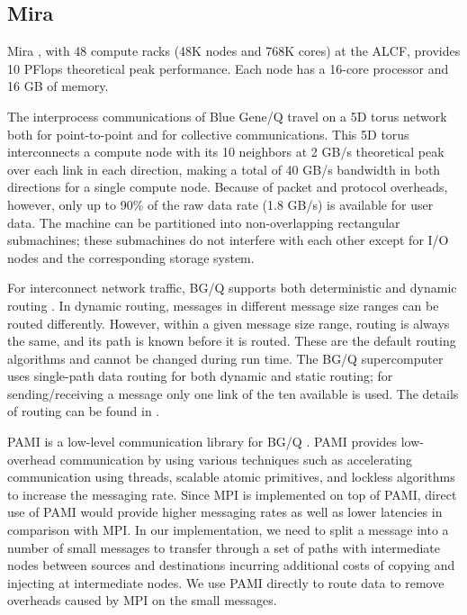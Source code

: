 \subsection{Mira}
\label{sec:system}

Mira \cite{Chen:BGQ}, with 48 compute racks (48K nodes and 768K cores) at the ALCF, provides 10 PFlops theoretical peak performance. Each node has a 16-core processor and 16 GB of memory.

The interprocess communications of Blue Gene/Q travel on a 5D torus network both for point-to-point and for collective communications. This 5D torus interconnects a compute node with its 10 neighbors at 2 GB/s theoretical peak over each link in each direction, making a total of 40 GB/s bandwidth in both directions for a single compute node. Because of packet and protocol overheads, however, only up to 90\% of the raw data rate (1.8 GB/s) is available for user data. The machine can be partitioned into non-overlapping rectangular submachines; these submachines do not interfere with each other except for I/O nodes and the corresponding storage system.

For interconnect network traffic, BG/Q supports both deterministic and dynamic routing \cite{Chen:BGQ}. In dynamic routing, messages in different message size ranges can be routed differently. However, within a given message size range, routing is always the same, and its path is known before it is routed. These are the default routing algorithms and cannot be changed during run time. The BG/Q supercomputer uses single-path data routing for both dynamic and static routing; for sending/receiving a message only one link of the ten available is used. The details of routing can be found in \cite{Chen:BGQ}.

PAMI is a low-level communication library for BG/Q \cite{PAMI:Kumar}. PAMI provides low-overhead communication by using various techniques such as accelerating communication using threads, scalable atomic primitives, and lockless algorithms to increase the messaging rate. Since MPI is implemented on top of PAMI, direct use of PAMI would provide higher messaging rates as well as lower latencies in comparison with MPI. In our implementation, we need to split a message into a number of small messages to transfer through a set of paths with intermediate nodes between sources and destinations incurring additional costs of copying and injecting at intermediate nodes. We use PAMI directly to route data to remove overheads caused by MPI on the small messages.
